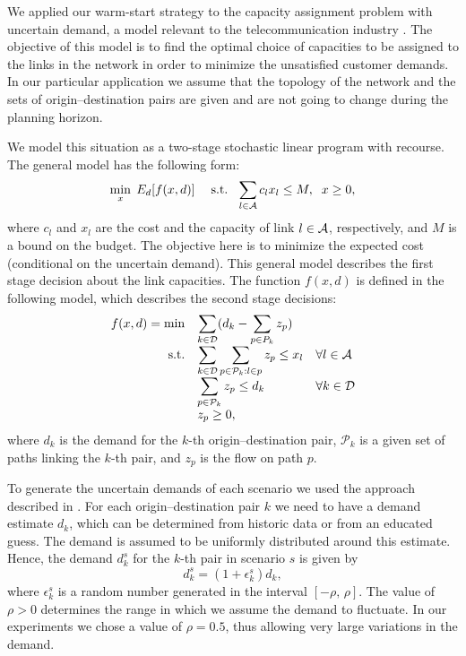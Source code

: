 We applied our warm-start strategy to the capacity assignment problem 
with uncertain demand, a model relevant to the telecommunication 
industry \cite{Ouorou}. The objective of this model is to find 
the optimal choice of capacities to be assigned to the links 
in the network in order to minimize the unsatisfied customer demands.
In our particular application we assume that the topology 
of the network and the sets of origin--destination pairs are given 
and are not going to change during the planning horizon.

We model this situation as a two-stage stochastic linear program 
with recourse. The general model has the following form:
\[
  \min_x \; E_d [f(x,d)] \;\quad 
  \mbox{s.t. }\; \sum_{l \in {\cal A}} c_l x_l \le M, \;\;  x \ge 0,
\]
where $c_l$ and $x_l$ are the cost and the capacity of link $l \in {\cal A}$, 
respectively, and $M$ is a bound on the budget. The objective 
here is to minimize the expected cost (conditional on the uncertain 
demand). This general model describes the first stage 
decision about the link capacities.
The function $f(x,d)$ is defined in the following model, which 
describes the second stage decisions:
\[
\begin{array}{rll}
  f(x,d) =\min & \displaystyle\sum_{k\in {\cal D}} (d_k -\sum_{p\in P_k} z_p)\\
  \mbox{s.t.}  & \displaystyle\sum_{k\in {\cal D}} \sum_{p\in {\cal P}_k: l\in p} z_p \le x_l
                                        & \forall l \in {\cal A} \\
               & \displaystyle\sum_{p\in {\cal P}_k} z_p \le d_k
                                        & \forall k \in {\cal D} \\
               & z_p \ge0,
\end{array}
\]
where $d_k$ is the demand for the $k$-th origin--destination pair, 
$\mathcal{P}_k$ is a given set of paths linking the $k$-th pair, and $z_p$ 
is the flow on path $p$.

To generate the uncertain demands of each scenario 
we used the approach described in \cite{Ouorou}. 
For each origin--destination pair $k$ we need to have a demand 
estimate $d_k$, which can be determined from historic data 
or from an educated guess. The demand is assumed to be uniformly 
distributed around this estimate. Hence, the demand $d_k^s$ 
for the $k$-th pair in scenario $s$ is given by
\[
d_k^s = (1+ \epsilon_k^s)d_k,
\]
where $\epsilon_k^s$ is a random number generated in the interval 
$[-\rho, \, \rho]$. The value of $\rho > 0$ determines the range 
in which we assume the demand to fluctuate.
In our experiments we chose a value of $\rho = 0.5$, thus allowing
very large variations in the demand.
%

